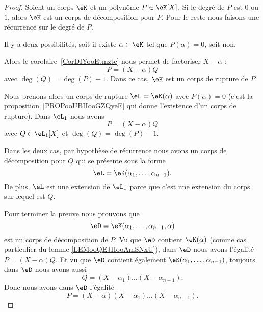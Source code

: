 \begin{proof}
	Soient un corps \( \eK\) et un polynôme \( P\in \eK[X]\). Si le degré de \( P\) est \( 0\) ou \( 1\), alors \( \eK\) est un corps de décomposition pour \( P\). Pour le reste nous faisons une récurrence sur le degré de \( P\).

	Il y a deux possibilités, soit il existe \( \alpha\in \eK\) tel que \( P(\alpha)=0\), soit non.

	\begin{subproof}
		Alors le corolaire~\ref{CorDIYooEtmztc} nous permet de factoriser \( X-\alpha\) :
		\begin{equation}
			P=(X-\alpha)Q
		\end{equation}
		avec \( \deg(Q)=\deg(P)-1\). Dans ce cas, \( \eK\) est un corps de rupture de \( P\).


		Nous prenons alors un corps de rupture \( \eL=\eK(\alpha)\) avec \( P(\alpha)=0\) (c'est la proposition~\ref{PROPooUBIIooGZQyeE} qui donne l'existence d'un corps de rupture). Dans \( \eL_1\) nous avons
		\begin{equation}
			P=(X-\alpha)Q
		\end{equation}
		avec \( Q\in \eL_1[X]\) et \( \deg(Q)=\deg(P)-1\).


		Dans les deux cas, par hypothèse de récurrence nous avons un corps de décomposition pour \( Q\) qui se présente sous la forme
		\begin{equation}
			\eL=\eK(\alpha_1,\ldots, \alpha_{n-1}).
		\end{equation}
		De plus, \( \eL\) est une extension de \( \eL_1\) parce que c'est une extension du corps sur lequel est \( Q\).

	\end{subproof}
	Pour terminer la preuve nous prouvons que
	\begin{equation}
		\eD=\eK(\alpha_1,\ldots, \alpha_{n-1},\alpha)
	\end{equation}
	est un corps de décomposition de \( P\). Vu que \( \eD\) contient \( \eK(\alpha)\) (comme cas particulier du lemme \ref{LEMooQEJHooAmSNxU}), dans \( \eD\) nous avons l'égalité \( P=(X-\alpha)Q\). Et vu que \( \eD\) contient également \( \eK(\alpha_1,\ldots, \alpha_{n-1})\), toujours dans \( \eD\) nous avons aussi
	\begin{equation}
		Q=(X-\alpha_1)\ldots(X-\alpha_{n-1}).
	\end{equation}
	Donc nous avons dans \( \eD\) l'égalité
	\begin{equation}
		P=(X-\alpha)(X-\alpha_1)\ldots (X-\alpha_{n-1}).
	\end{equation}
\end{proof}

